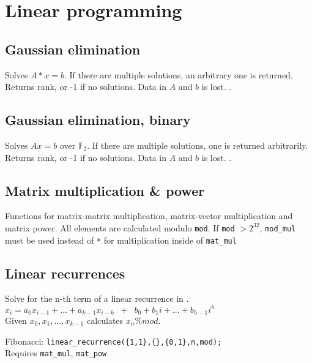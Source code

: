 \section{Linear programming}

\subsection{Gaussian elimination}
Solves $A * x = b$. If there are multiple solutions, an arbitrary one is returned. Returns rank, or -1 if no solutions. Data in $A$ and $b$ is lost. .


\subsection{Gaussian elimination, binary}
Solves $Ax = b$ over $\mathbb F_2$. If there are multiple solutions, one is returned arbitrarily. Returns rank, or -1 if no solutions. Data in $A$ and $b$ is lost. .


\subsection{Matrix multiplication \& power}
Functions for matrix-matrix multiplication, matrix-vector multiplication and matrix power. All elements are calculated modulo \verb|mod|. If \verb|mod| $> 2^{32}$, \verb|mod_mul| must be used instead of \verb|*| for multiplication inside of \verb|mat_mul|


\subsection{Linear recurrences}
Solve for the n-th term of a linear recurrence in .\\
$x_i = a_0 x_{i-1} + ... + a_{k-1} x_{i-k} \;\; + \;\; b_0 + b_1 i + ... + b_{h-1} i^h$ \\
Given $x_0, x_1, ..., x_{k-1}$ calculates $x_n \% mod$.

Fibonacci: \texttt{linear\_recurrence(\{1,1\},\{\},\{0,1\},n,mod);}\\
Requires \verb|mat_mul|, \verb|mat_pow|

